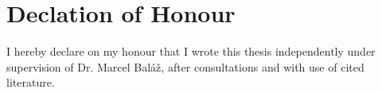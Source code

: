 \thispagestyle{empty}
\vspace*{\fill}
\section*{Declation of Honour}

I hereby declare on my honour that I wrote this thesis independently under supervision of Dr. Marcel Baláž, after consultations and with use of cited literature.

\vspace{3\medskipamount}\noindent
\SignPlace \SignDateEN \hspace*{\fill} \signaturespace{5cm}{\Author} 
